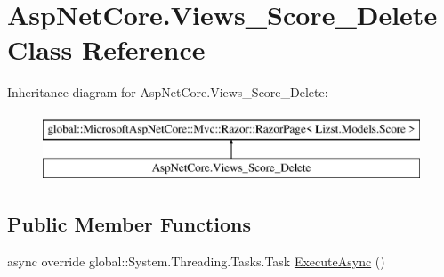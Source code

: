 \hypertarget{class_asp_net_core_1_1_views___score___delete}{}\section{Asp\+Net\+Core.\+Views\+\_\+\+Score\+\_\+\+Delete Class Reference}
\label{class_asp_net_core_1_1_views___score___delete}
Inheritance diagram for Asp\+Net\+Core.\+Views\+\_\+\+Score\+\_\+\+Delete\+:\begin{figure}[H]
\begin{center}
\leavevmode
\includegraphics[height=2.000000cm]{class_asp_net_core_1_1_views___score___delete}
\end{center}
\end{figure}
\subsection*{Public Member Functions}
\begin{DoxyCompactItemize}
\item 
async override global\+::\+System.\+Threading.\+Tasks.\+Task \mbox{\hyperlink{class_asp_net_core_1_1_views___score___delete_a71174f7a291bb968c5a5ae92eb98a1ad}{Execute\+Async}} ()
\end{DoxyCompactItemize}
